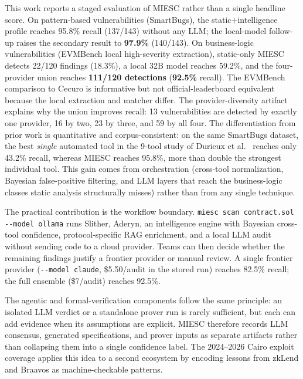 \documentclass[conference]{IEEEtran}
\begin{document}
This work reports a staged evaluation of MIESC rather than a single headline score. On pattern-based vulnerabilities (SmartBugs), the static+intelligence profile reaches 95.8\% recall (137/143) without any LLM; the local-model follow-up raises the secondary result to \textbf{97.9\%} (140/143). On business-logic vulnerabilities (EVMBench local high-severity extraction), static-only MIESC detects 22/120 findings (18.3\%), a local 32B model reaches 59.2\%, and the four-provider union reaches \textbf{111/120 detections} (\textbf{92.5\%} recall). The EVMBench comparison to Cecuro is informative but not official-leaderboard equivalent because the local extraction and matcher differ. The provider-diversity artifact explains why the union improves recall: 13 vulnerabilities are detected by exactly one provider, 16 by two, 23 by three, and 59 by all four. The differentiation from prior work is quantitative and corpus-consistent: on the same SmartBugs dataset, the best \emph{single} automated tool in the 9-tool study of Durieux et al.~\cite{durieux2020empirical} reaches only 43.2\% recall, whereas MIESC reaches 95.8\%, more than double the strongest individual tool. This gain comes from orchestration (cross-tool normalization, Bayesian false-positive filtering, and LLM layers that reach the business-logic classes static analysis structurally misses) rather than from any single technique.

The practical contribution is the workflow boundary. \texttt{miesc scan contract.sol -{}-model ollama} runs Slither, Aderyn, an intelligence engine with Bayesian cross-tool confidence, protocol-specific RAG enrichment, and a local LLM audit without sending code to a cloud provider. Teams can then decide whether the remaining findings justify a frontier provider or manual review. A single frontier provider (\texttt{-{}-model claude}, \$5.50/audit in the stored run) reaches 82.5\% recall; the full ensemble (\$7/audit) reaches 92.5\%.

The agentic and formal-verification components follow the same principle: an isolated LLM verdict or a standalone prover run is rarely sufficient, but each can add evidence when its assumptions are explicit. MIESC therefore records LLM consensus, generated specifications, and prover inputs as separate artifacts rather than collapsing them into a single confidence label. The 2024--2026 Cairo exploit coverage applies this idea to a second ecosystem by encoding lessons from zkLend and Braavos as machine-checkable patterns.
\end{document}
